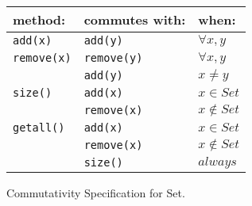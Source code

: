 \begin{tabular}{lll}
\textbf{method:} & \textbf{commutes with:} & \textbf{when:} \\
\hline
\texttt{add(x)} & \texttt{add(y)} & $\forall x, y$ \\
\texttt{remove(x)} & \texttt{remove(y)} & $\forall x, y$ \\
    & \texttt{add(y)} & $x \ne y$ \\
\texttt{size()} & \texttt{add(x)} & $x \in Set$ \\
    & \texttt{remove(x)} & $x \notin Set$ \\
\texttt{getall()} & \texttt{add(x)} & $x \in Set$ \\
    & \texttt{remove(x)} & $x \notin Set$ \\
    & \texttt{size()} & $always$ \\
    \hline
\end{tabular}
Commutativity Specification for Set.
\label{tab:spec}